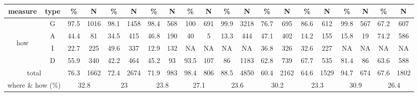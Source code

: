 \begin{table}[ht]
\begin{center}
\begin{footnotesize}
\begin{tabular}{|cc|cc|cc|cc|cc|cc|cc|cc|cc|cc|}
\hline
measure & type & \% & N & \% & N & \% & N & \% & N & \% & N & \% & N & \% & N & \% & N & \% & N \\
\hline
 & G & 97.5 & 1016 & 98.1 & 1458 & 98.4 & 568 & 100 & 691 & 99.9 & 3218 & 76.7 & 695 & 86.6 & 612 & 99.8 & 567 & 67.2 & 607 \\
\multirow{3}{3mm}{\begin{sideways}\parbox{3mm}{\begin{small}how\end{small}}\end{sideways}}
 & A & 44.4 & 81 & 34.5 & 415 & 46.8 & 190 & 40 & 5 & 13.3 & 444 & 47.1 & 402 & 14.2 & 155 & 15.8 & 19 & 74.2 & 586 \\
 & I & 22.7 & 225 & 49.6 & 337 & 12.9 & 132 & NA & NA & NA & NA & 36.8 & 326 & 32.6 & 227 & NA & NA & NA & NA \\
 & D & 55.9 & 340 & 42.2 & 464 & 45.2 & 93 & 93.5 & 107 & 86 & 1183 & 62.8 & 739 & 67.7 & 535 & 81.4 & 86 & 63.6 & 588 \\
\multicolumn{2}{|c|}{total} & 76.3 & 1662 & 72.4 & 2674 & 71.9 & 983 & 98.4 & 806 & 88.5 & 4850 & 60.4 & 2162 & 64.6 & 1529 & 94.7 & 674 & 67.6 & 1802 \\
\hline
\multicolumn{2}{|c|}{where \& how (\%)} & \multicolumn{2}{|c|}{32.8} & \multicolumn{2}{|c|}{23}& \multicolumn{2}{|c|}{23.8}& \multicolumn{2}{|c|}{27.1}& \multicolumn{2}{|c|}{23.6}& \multicolumn{2}{|c|}{30.2}& \multicolumn{2}{|c|}{23.3}& \multicolumn{2}{|c|}{30.9}& \multicolumn{2}{|c|}{26.4}\\
\hline
\end{tabular}
\label{tab:all_results}
\end{footnotesize}
\end{center}
\end{table}

